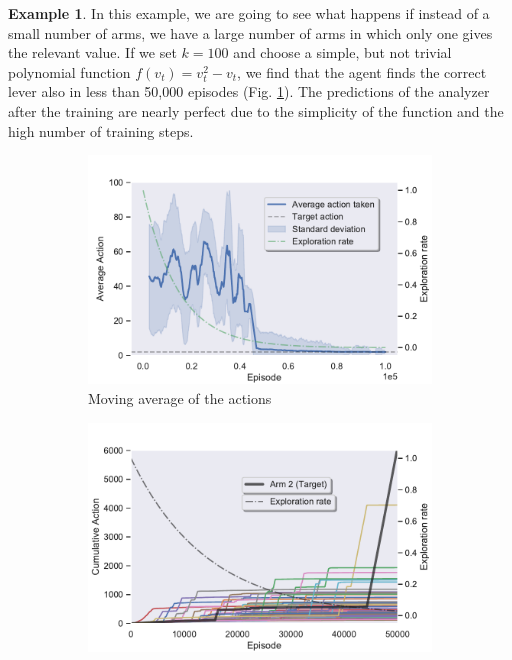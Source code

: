\documentclass[11pt,a4paper,twoside]{report}
\newcommand{\+}{\textnormal{+} }
\theoremstyle{definition}
\newtheorem{myex}[mythm]{Example}
\numberwithin{equation}{chapter}
\begin{document}
  \begin{myex} \label{MAB3ex}
    In this example, we are going to see what happens if instead of a small
    number of arms, we have a large number of arms in which only one gives the
    relevant value. If we set $k=100$ and choose a simple, but not trivial
    polynomial function $f(v_t)=v_t^2-v_t$, we find that the agent finds the
    correct lever also in less than 50,000 episodes (Fig.
    \ref{fig:ActionAverageMAB3}). The predictions of the analyzer after the
    training are nearly perfect due to the simplicity of the function and the
    high number of training steps.

    \begin{figure}[]
      \centering
      \begin{subfigure}{.5\textwidth}
        \centering
        \includegraphics[width=1\linewidth]{figures/Actions-MAB3.pdf}
        \caption{Moving average of the actions}
        \label{fig:ActionAverageMAB3}
      \end{subfigure}%
      \begin{subfigure}{.5\textwidth}
        \centering
        \includegraphics[width=1\linewidth]{figures/Cum-action-MAB3.pdf}

\end{subfigure}
\end{figure}
\end{myex}
\end{document}
